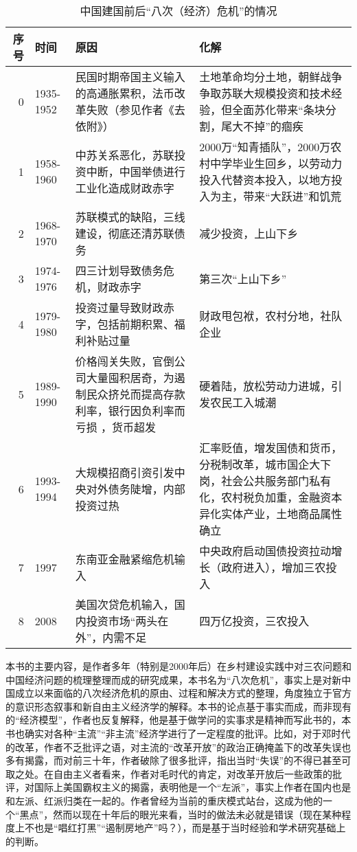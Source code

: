 \begin{table}[htpb]
\centering
\caption{中国建国前后“八次（经济）危机”的情况}
\begin{tabular}{r | l | p{} | p{}}
序号 & 时间 & 原因 & 化解 \\
\hline
0 & 1935-1952 & 民国时期帝国主义输入的高通胀累积，法币改革失败（参见作者《去依附》） &土地革命均分土地，朝鲜战争争取苏联大规模投资和技术经验，但全面苏化带来“条块分割，尾大不掉”的痼疾 \\
1 & 1958-1960 &中苏关系恶化，苏联投资中断，中国举债进行工业化造成财政赤字 & 2000万“知青插队”，2000万农村中学毕业生回乡，以劳动力投入代替资本投入，以地方投入为主，带来“大跃进”和饥荒 \\
2 & 1968-1970 &苏联模式的缺陷，三线建设，彻底还清苏联债务 &减少投资，上山下乡 \\
3 & 1974-1976 & 四三计划导致债务危机，财政赤字 & 第三次“上山下乡” \\
4 & 1979-1980 &投资过量导致财政赤字，包括前期积累、福利补贴过量  &财政甩包袱，农村分地，社队企业 \\
5 & 1989-1990 &价格闯关失败，官倒公司大量囤积居奇，为遏制民众挤兑而提高存款利率，银行因负利率而亏损 ，货币超发&硬着陆，放松劳动力进城，引发农民工入城潮 \\
6 & 1993-1994 & 大规模招商引资引发中央对外债务陡增，内部投资过热 &汇率贬值，增发国债和货币，分税制改革，城市国企大下岗，社会公共服务部门私有化，农村税负加重，金融资本异化实体产业，土地商品属性确立 \\
7 & 1997 & 东南亚金融紧缩危机输入 & 中央政府启动国债投资拉动增长（政府进入），增加三农投入 \\
8 & 2008 & 美国次贷危机输入，国内投资市场“两头在外”，内需不足 & 四万亿投资，三农投入 \\
\hline
\end{tabular}
\end{table}

本书的主要内容，是作者多年（特别是2000年后）在乡村建设实践中对三农问题和中国经济问题的梳理整理而成的研究成果，本书名为“八次危机”，事实上是对新中国成立以来面临的八次经济危机的原由、过程和解决方式的整理，角度独立于官方的意识形态叙事和新自由主义经济学的解释。本书的论点基于事实而成，而非现有的“经济模型”，作者也反复解释，他是基于做学问的实事求是精神而写此书的，本书也确实对各种“主流”“非主流”经济学进行了一定程度的批评。比如，对于邓时代的改革，作者不乏批评之语，对主流的“改革开放”的政治正确掩盖下的改革失误也多有揭露，而对前三十年，作者破除了很多批评，指出当时“失误”的不得已甚至可取之处。在自由主义者看来，作者对毛时代的肯定，对改革开放后一些政策的批评，对国际上美国霸权主义的揭露，表明他是一个“左派”，事实上作者在国内也是和左派、红派归类在一起的。作者曾经为当前的重庆模式站台，这成为他的一个“黑点”，然而以现在十年后的眼光来看，当时的做法未必就是错误（现在某种程度上不也是“唱红打黑”“遏制房地产”吗？），而是基于当时经验和学术研究基础上的判断。

